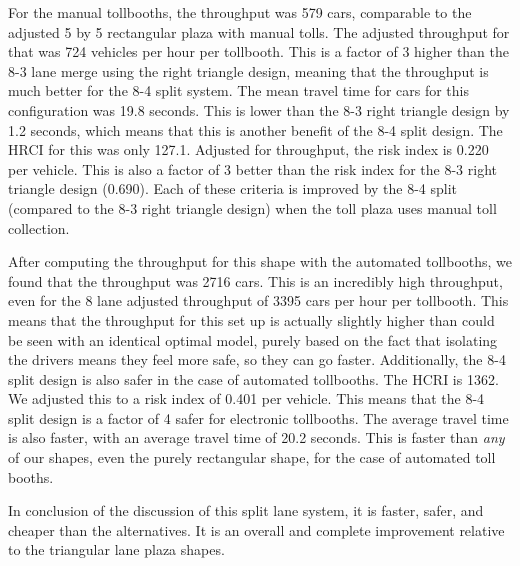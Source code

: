 \documentclass[a4paper, 11pt]{article}
\begin{document}
For the manual tollbooths, the throughput was 579 cars, comparable to the adjusted 5 by 5 rectangular plaza with manual tolls. The adjusted throughput for that was 724 vehicles per hour per tollbooth. This is a factor of 3 higher than the 8-3 lane merge using the right triangle design, meaning that the throughput is much better for the 8-4 split system. 
The mean travel time for cars for this configuration was 19.8 seconds. This is lower than the 8-3 right triangle design by 1.2 seconds, which means that this is another benefit of the 8-4 split design. 
The HRCI for this was only 127.1. Adjusted for throughput, the risk index is 0.220 per vehicle. This is also a factor of 3 better than the risk index for the 8-3 right triangle design (0.690). Each of these criteria is improved by the 8-4 split (compared to the 8-3 right triangle design) when the toll plaza uses manual toll collection. 

After computing the throughput for this shape with the automated tollbooths, we found that the throughput was 2716 cars. This is an incredibly high throughput, even for the 8 lane adjusted throughput of 3395 cars per hour per tollbooth. %
This means that the throughput for this set up is actually slightly higher than could be seen with an identical optimal model, purely based on the fact that isolating the drivers means they feel more safe, so they can go faster. Additionally, the 8-4 split design is also safer in the case of automated tollbooths. The HCRI is 1362. We adjusted this to a risk index of 0.401 per vehicle. This means that the 8-4 split design is a factor of 4 safer for electronic tollbooths.  The average travel time is also faster, with an average travel time of 20.2 seconds. This is faster than \textit{any} of our shapes, even the purely rectangular shape, for the case of automated toll booths. 

In conclusion of the discussion of this split lane system, it is faster, safer, and cheaper than the alternatives. It is an overall and complete improvement relative to the triangular lane plaza shapes. 
\end{document}
